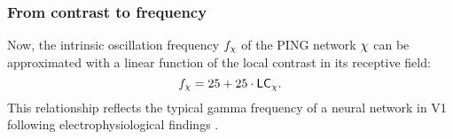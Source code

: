 \subsubsection{From contrast to frequency}

Now, the intrinsic oscillation frequency $f_\chi$ of the PING network $\chi$ can be approximated with a linear function of the local contrast in its receptive field:
\begin{equation}
    f_\chi = 25 + 25 \cdot \mathsf{LC}_\chi.
\end{equation}
This relationship reflects the typical gamma frequency of a neural network in V1 following electrophysiological findings \cite{Roberts2013, MaryamPLACEHOLDER}.